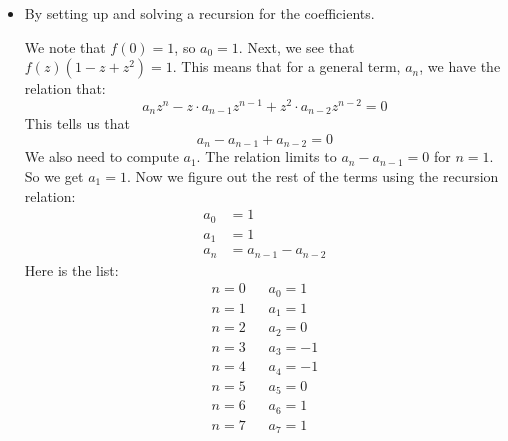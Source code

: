 \documentclass{article}
\begin{document}
\begin{itemize}
        \item By setting up and solving a recursion for the coefficients. 
            \begin{answer}
                We note that $f(0) = 1$, so $a_{0} = 1$. Next, we see that $f(z)(1 - z + z^{2}) = 1$. This means that for a general term, $a_{n}$, we have the relation that:
                    \begin{equation*}
                        a_{n}z^{n} - z \cdot a_{n - 1} z^{n - 1} + z^{2} \cdot a_{n - 2}z^{n - 2} = 0
                    \end{equation*}
                This tells us that
                    \begin{equation*}
                        a_{n} - a_{n - 1} + a_{n - 2} = 0
                    \end{equation*}
                We also need to compute $a_{1}$. The relation limits to $a_{n} - a_{n - 1} = 0$ for $n = 1$. So we get $a_{1} = 1$. Now we figure out the rest of the terms using the recursion relation:
                    \begin{align*}
                        a_{0} &= 1                     \\
                        a_{1} &= 1                     \\
                        a_{n} &= a_{n - 1} - a_{n - 2}   
                    \end{align*}
                Here is the list:
                    \begin{align*}
                        n = 0  &\hspace{10pt} a_{0} = 1  \\
                        n = 1  &\hspace{10pt} a_{1} = 1  \\
                        n = 2  &\hspace{10pt} a_{2} = 0  \\
                        n = 3  &\hspace{10pt} a_{3} = -1 \\
                        n = 4  &\hspace{10pt} a_{4} = -1 \\
                        n = 5  &\hspace{10pt} a_{5} = 0  \\
                        n = 6  &\hspace{10pt} a_{6} = 1  \\
                        n = 7  &\hspace{10pt} a_{7} = 1  \\

\end{align*}
\end{answer}
\end{itemize}
\end{document}

